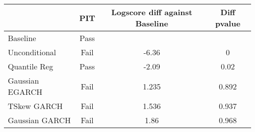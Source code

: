 \begin{tabular}{lccc}
\toprule
  & PIT & Logscore diff against Baseline & Diff pvalue \\ 
  \midrule
	Baseline & Pass &  &  \\ 
	Unconditional & Fail & -6.36 & 0 \\ 
	Quantile Reg & Pass & -2.09 & 0.02 \\ 
	Gaussian EGARCH & Fail & 1.235 & 0.892 \\ 
	TSkew GARCH & Fail & 1.536 & 0.937 \\ 
  Gaussian GARCH & Fail & 1.86 & 0.968 \\ 
\bottomrule
\end{tabular}
